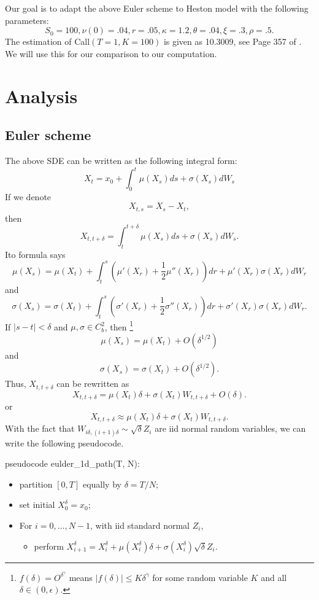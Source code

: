 \documentclass{article}
\begin{document}
Our goal is to adapt the above Euler scheme to Heston model with the following parameters:
$$ S_{0} = 100, \nu(0) = .04, r = .05, \kappa = 1.2, 
\theta = .04, \xi = .3, \rho = .5.$$
The estimation of Call$(T =1, K = 100)$ is given as 10.3009, see Page 357 of \cite{Gla04}. We will use this for our comparison to our computation.



\section{Analysis}
\subsection{Euler scheme}
The above SDE can be written as the following integral form:
$$
X_{t} = x_{0}  + \int_{0}^{t}  \mu(X_{s}) ds + \sigma(X_{s}) dW_{s}
$$
If we denote 
$$X_{t,s} = X_{s} - X_{t},$$
then 
$$X_{t,t+\delta} = \int_{t}^{t+\delta}  \mu(X_{s}) ds + \sigma(X_{s}) dW_{s}.$$
Ito formula says
$$
\mu(X_{s}) =
\mu(X_{t}) + \int_{t}^{s} (\mu'(X_{r}) + \frac 1 2 \mu''(X_{r})) dr + \mu'(X_{r}) \sigma(X_{r}) dW_{r}
$$
and
$$
\sigma(X_{s}) =
\sigma(X_{t}) + 
\int_{t}^{s} (\sigma'(X_{r}) + \frac 1 2 \sigma''(X_{r})) dr + \sigma'(X_{r}) \sigma(X_{r}) dW_{r}.
$$
If $|s - t| < \delta$ and $\mu, \sigma \in C_{b}^{2}$, then
\footnote{
$f(\delta) = O^{\delta^{\gamma}}$ means 
$|f(\delta)| \le K \delta^{\gamma}$
for some random variable $K$ and all $\delta \in (0, \epsilon)$.
}
$$\mu(X_{s}) = \mu(X_{t}) + O(\delta^{1/2})$$
and 
$$\sigma(X_{s}) = \sigma(X_{t}) + O(\delta^{1/2}).$$
Thus, $X_{t, t+\delta}$ can be rewritten as
$$X_{t, t+\delta} = \mu(X_{t}) \delta + \sigma(X_{t}) W_{t,t+\delta} + O(\delta).
$$
or 
$$
X_{t, t+\delta} \approx \mu(X_{t}) \delta + \sigma(X_{t}) W_{t,t+\delta}.
$$
With the fact that $W_{i \delta, (i+1)\delta} \sim \sqrt \delta Z_{i}$ are iid normal random variables, we can write the following pseudocode.

pseudocode eulder\_1d\_path(T, N):
\begin{itemize}
 \item partition $[0, T]$ equally by $\delta = T/N$;
 \item set initial $X_{0}^{\delta} = x_{0}$;
 \item For $i = 0, \ldots, N-1$,  with iid standard normal $Z_{i}$, 
\begin{itemize}
 \item perform $X_{i+1}^{\delta} = X_{i}^{\delta} + \mu(X_{i}^{\delta}) \delta + 
 \sigma(X_{i}^{\delta}) \sqrt \delta Z_{i}.$
\end{itemize}

\end{itemize}
\end{document}
